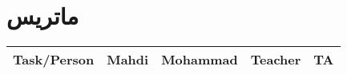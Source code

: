 \documentclass[11pt, oneside]{book}
\begin{document}
\frontmatter

\tableofcontents
\mainmatter

\chapter{ماتریس }
\begin{table}[H]
\begin{latin}
\begin{center}
\begin{tabular}{|c|c|c|c|c|}
\hline
Task/Person & Mahdi & Mohammad & Teacher & TA \\
\hline
\end{tabular}
\end{center}
\end{latin}
\end{table}


\end{document}
